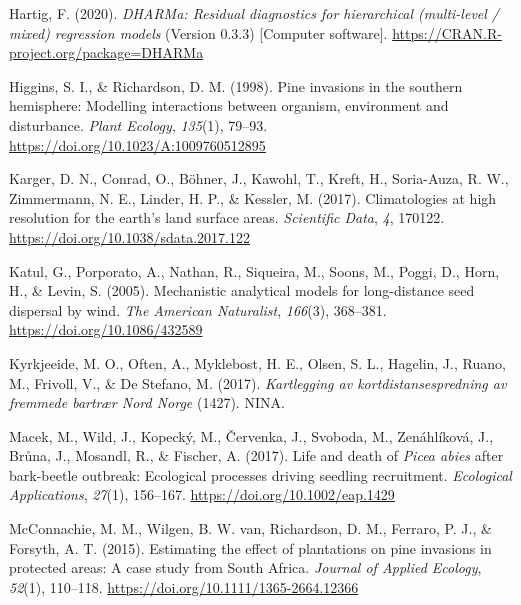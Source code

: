 \documentclass[
]{article}
\newlength{\cslhangindent}
\newenvironment{CSLReferences}[2] %
 {\begin{list}{}{%
  \setlength{\itemindent}{0pt}
  \setlength{\leftmargin}{0pt}
  \setlength{\parsep}{0pt}
  \ifodd #1
   \setlength{\leftmargin}{\cslhangindent}
   \setlength{\itemindent}{-1\cslhangindent}
  \fi
  \setlength{\itemsep}{#2\baselineskip}}}
 {\end{list}}
\begin{document}
\begin{CSLReferences}{1}{0}
Hartig, F. (2020). \emph{{DHARMa}: {Residual} diagnostics for hierarchical (multi-level / mixed) regression models} (Version 0.3.3) {[}Computer software{]}. \url{https://CRAN.R-project.org/package=DHARMa}

Higgins, S. I., \& Richardson, D. M. (1998). Pine invasions in the southern hemisphere: Modelling interactions between organism, environment and disturbance. \emph{Plant Ecology}, \emph{135}(1), 79--93. \url{https://doi.org/10.1023/A:1009760512895}

Karger, D. N., Conrad, O., Böhner, J., Kawohl, T., Kreft, H., Soria-Auza, R. W., Zimmermann, N. E., Linder, H. P., \& Kessler, M. (2017). Climatologies at high resolution for the earth's land surface areas. \emph{Scientific Data}, \emph{4}, 170122. \url{https://doi.org/10.1038/sdata.2017.122}

Katul, G., Porporato, A., Nathan, R., Siqueira, M., Soons, M., Poggi, D., Horn, H., \& Levin, S. (2005). Mechanistic analytical models for long-distance seed dispersal by wind. \emph{The American Naturalist}, \emph{166}(3), 368--381. \url{https://doi.org/10.1086/432589}

Kyrkjeeide, M. O., Often, A., Myklebost, H. E., Olsen, S. L., Hagelin, J., Ruano, M., Frivoll, V., \& De Stefano, M. (2017). \emph{Kartlegging av kortdistansespredning av fremmede bartrær {Nord Norge}} (1427). {NINA}.

Macek, M., Wild, J., Kopecký, M., Červenka, J., Svoboda, M., Zenáhlíková, J., Brůna, J., Mosandl, R., \& Fischer, A. (2017). Life and death of {\emph{Picea abies}} after bark-beetle outbreak: Ecological processes driving seedling recruitment. \emph{Ecological Applications}, \emph{27}(1), 156--167. \url{https://doi.org/10.1002/eap.1429}

McConnachie, M. M., Wilgen, B. W. van, Richardson, D. M., Ferraro, P. J., \& Forsyth, A. T. (2015). Estimating the effect of plantations on pine invasions in protected areas: A case study from {South Africa}. \emph{Journal of Applied Ecology}, \emph{52}(1), 110--118. \url{https://doi.org/10.1111/1365-2664.12366}


\end{CSLReferences}
\end{document}
